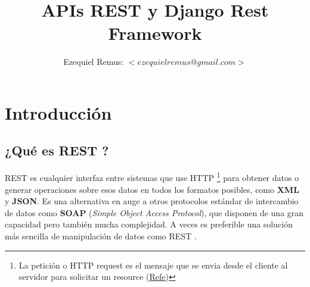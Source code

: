\documentclass[10pt]{article}
\title{\bfseries \huge {APIs REST y Django Rest Framework} }
\author{Ezequiel Remus: $<ezequielremus@gmail.com>$}
\date{}
\newcommand{\rest}[1]{{\textcolor{Mag}{REST} #1}}
\newcommand{\http}[1]{{\textcolor{B}{HTTP} #1}}
\begin{document}
\renewcommand{\tablename}{Tabla}
\maketitle
\newpage
\tableofcontents
\newpage
\section{Introducción}
\subsection{¿Qué es \rest{}?}

 \rest{} es cualquier interfaz entre sistemas que use \http{}{\footnote{La petición o HTTP request  es el mensaje que se envia desde el cliente al servidor para solicitar un resource (\textcolor{B}{\href{https://diego.com.es/peticion-http}{Refe}})}} para obtener datos o generar operaciones sobre esos datos en todos los formatos posibles, como \textbf{XML} y \textbf{JSON}. Es una alternativa en auge a otros protocolos estándar de intercambio de datos como \textbf{SOAP} (\textit{Simple Object Access Protocol}), que disponen de una gran capacidad pero también mucha complejidad. A veces es preferible una solución más sencilla de manipulación de datos como \rest{}.
\end{document}
